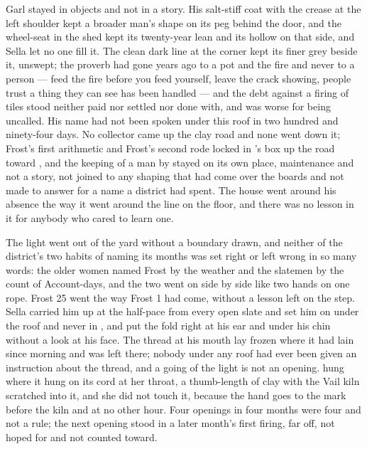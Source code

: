 Garl stayed in objects and not in a story. His salt-stiff coat with the crease at the left shoulder kept a broader man's shape on its peg behind the door, and the wheel-seat in the shed kept its twenty-year lean and its hollow on that side, and Sella let no one fill it. The clean dark line at the corner kept its finer grey beside it, unswept; the proverb had gone years ago to a pot and the fire and never to a person --- feed the fire before you feed yourself, leave the crack showing, people trust a thing they can see has been handled --- and the debt against a firing of tiles stood neither paid nor settled nor done with, and was worse for being uncalled. His name had not been spoken under this roof in two hundred and ninety-four days. No collector came up the clay road and none went down it; Frost's first arithmetic and Frost's second rode locked in 's box up the road toward , and the keeping of a man by  stayed on its own place, maintenance and not a story, not joined to any shaping that had come over the boards and not made to answer for a name a district had spent. The house went around his absence the way it went around the line on the floor, and there was no lesson in it for anybody who cared to learn one.

\scenebreak

The light went out of the yard without a boundary drawn, and neither of the district's two habits of naming its months was set right or left wrong in so many words: the older women named Frost by the weather and the slatemen by the count of Account-days, and the two went on side by side like two hands on one rope. Frost 25 went the way Frost 1 had come, without a lesson left on the step. Sella carried him up at the half-pace from every open slate and set him on  under the roof and never in , and put the fold right at his ear and under his chin without a look at his face. The thread at his mouth lay frozen where it had lain since morning and was left there; nobody under any roof had ever been given an instruction about the thread, and a going of the light is not an opening.  hung where it hung on its cord at her throat, a thumb-length of  clay with the Vail kiln scratched into it, and she did not touch it, because the hand goes to the mark before the kiln and at no other hour. Four openings in four months were four and not a rule; the next opening stood in a later month's first firing, far off, not hoped for and not counted toward.

